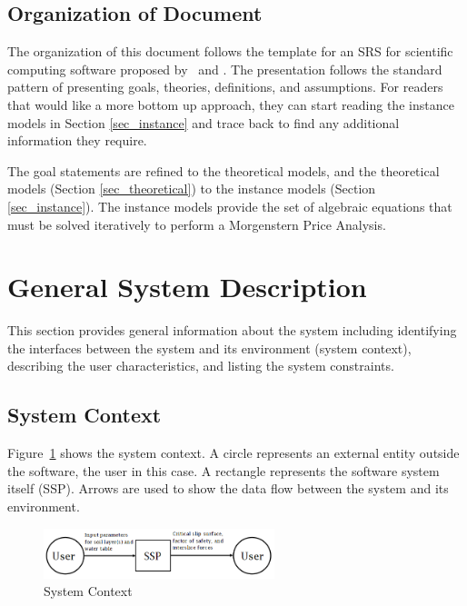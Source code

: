 \documentclass[12pt]{article}
\newcommand{\progname}{SSP}
\begin{document}
\subsection{Organization of Document}

The organization of this document follows the template for an SRS for
scientific computing software proposed by~\cite{Koothoor2013} and
\cite{SmithAndLai2005}.  The presentation follows the standard pattern
of presenting goals, theories, definitions, and assumptions.  For
readers that would like a more bottom up approach, they can start
reading the instance models in Section \ref{sec_instance} and trace
back to find any additional information they require.

The goal statements 
are refined to the theoretical models, and the
theoretical models (Section \ref{sec_theoretical}) to the instance
models (Section \ref{sec_instance}). The instance
models provide the set of algebraic equations that must be solved
iteratively to perform a Morgenstern Price Analysis.


\section{General System Description}

This section provides general information about the system including
identifying the interfaces between the system and its environment (system 
context),
describing the user characteristics, and listing the system constraints.

\subsection{System Context}

Figure~\ref{Fig_SystemContext}
 shows the system context.  A circle represents an
external entity outside the software, the user in this case.  A rectangle
represents the software system itself (\progname).  Arrows are used to show the 
data
flow between the system and its environment.

\begin{figure}[h!]
	\begin{center}
		\includegraphics[width=0.6\textwidth]{SystemContextFigure.png}
		\caption{System Context}
		\label{Fig_SystemContext}
	\end{center}
\end{figure}
\end{document}
